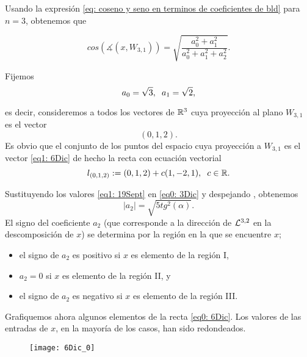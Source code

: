 \begin{ejemplo}
Usando la expresión \eqref{eq: coseno y seno en terminos de coeficientes de bld}
para $n =3$, obtenemos que


\begin{equation}
\label{eq0: 3Dic}
cos(\measuredangle(x, W_{3,1}))= 
\sqrt{\frac{a_{0}^{2}+a_{1}^{2}}{a_{0}^{2}+a_{1}^{2}+a_{2}^{2}}}.
\end{equation}

\noindent
Fijemos
\begin{equation}
\label{eq1: 19Sept}
a_{0}= \sqrt{3}, \hspace{0.2cm} a_{1}= \sqrt{2},
\end{equation}

\noindent
es decir, consideremos a todos los vectores de $\mathbb{R}^{3}$
cuya proyección al plano $W_{3,1}$ es 
el vector
\begin{equation}
\label{eq1: 6Dic}
(0,1,2).
\end{equation}
Es obvio que el conjunto de los puntos
del espacio cuya proyección a
$W_{3,1}$ es el vector \eqref{eq1: 6Dic} de hecho la recta
con ecuación vectorial
\begin{equation}
\label{eq0: 6Dic}
l_{(0,1,2)} := (0,1,2)+c(1,-2,1), \hspace{0.2cm} c \in \mathbb{R}.
\end{equation}

\noindent
Sustituyendo
los valores \eqref{eq1: 19Sept} en \eqref{eq0: 3Dic} y
despejando
, obtenemos 
\[
|a_{2}|= \sqrt{5 tg^{2}(\alpha)}.
\]
El signo del coeficiente $a_{2}$ (que corresponde a la dirección
de $\mathcal{L}^{3,2}$ en la descomposición de $x$) se determina por
la región en la que se encuentre $x$;

\begin{itemize}
\item el signo de $a_{2}$ es positivo si $x$ es elemento de la región I,
\item $a_{2}=0$ si $x$ es elemento de la región II, y
\item el signo de $a_{2}$ es negativo si $x$ es elemento de la región III.
\end{itemize}


Grafiquemos ahora algunos elementos
de la recta \eqref{eq0: 6Dic}.
Los valores de las entradas de $x$, en la
mayoría de los casos, han sido redondeados.


\begin{figure}[H]
	\centering
	\texttt{[image: 6Dic\_0]}
\end{figure}




\end{ejemplo}
